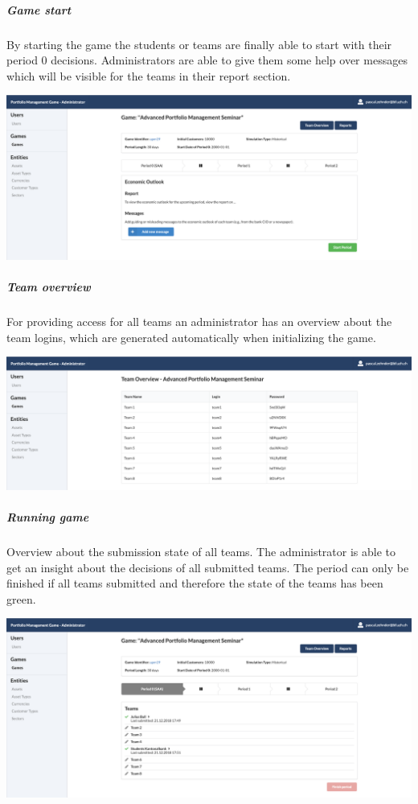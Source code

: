 \subparagraph{Game start}
By starting the game the students or teams are finally able to start with their period 0 decisions. Administrators are able to give them some help over messages which will be visible for the teams in their report section.
\begin{center}
  \includegraphics[scale=0.2]{img/application-overview/administrator/game_start.png}
\end{center}

\subparagraph{Team overview}
For providing access for all teams an administrator has an overview about the team logins, which are generated automatically when initializing the game.
\begin{center}
  \includegraphics[scale=0.2]{img/application-overview/administrator/team_login_overview.png}
\end{center}

\subparagraph{Running game}
Overview about the submission state of all teams. The administrator is able to get an insight about the decisions of all submitted teams. The period can only be finished if all teams submitted and therefore the state of the teams has been green.
\begin{center}
  \includegraphics[scale=0.2]{img/application-overview/administrator/running_game.png}
\end{center}

